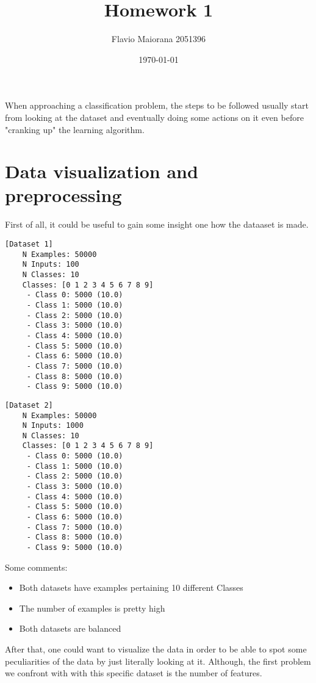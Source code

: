 \documentclass[12pt,a4paper,oneside]{article}
\title{Homework 1}	                                    %
\author{Flavio Maiorana 2051396}				                %
\date{\today}								    %
\begin{document}

\newpage

When approaching a classification problem, the steps to be followed
usually start from looking at the dataset and eventually doing some actions on
it even before "cranking up" the learning algorithm.

\section{Data visualization and preprocessing}

First of all, it could be useful to gain some insight one how the dataaset is
made.

\begin{verbatim}[Dataset 1]
    N Examples: 50000
    N Inputs: 100
    N Classes: 10
    Classes: [0 1 2 3 4 5 6 7 8 9]
     - Class 0: 5000 (10.0)
     - Class 1: 5000 (10.0)
     - Class 2: 5000 (10.0)
     - Class 3: 5000 (10.0)
     - Class 4: 5000 (10.0)
     - Class 5: 5000 (10.0)
     - Class 6: 5000 (10.0)
     - Class 7: 5000 (10.0)
     - Class 8: 5000 (10.0)
     - Class 9: 5000 (10.0)
\end{verbatim}

\begin{verbatim}[Dataset 2]
    N Examples: 50000
    N Inputs: 1000
    N Classes: 10
    Classes: [0 1 2 3 4 5 6 7 8 9]
     - Class 0: 5000 (10.0)
     - Class 1: 5000 (10.0)
     - Class 2: 5000 (10.0)
     - Class 3: 5000 (10.0)
     - Class 4: 5000 (10.0)
     - Class 5: 5000 (10.0)
     - Class 6: 5000 (10.0)
     - Class 7: 5000 (10.0)
     - Class 8: 5000 (10.0)
     - Class 9: 5000 (10.0)
\end{verbatim}

\newpage

Some comments:
\begin{itemize}
    \item Both datasets have examples pertaining 10 different Classes
    \item The number of examples is pretty high 
    \item Both datasets are balanced
\end{itemize}

After that, one could want to visualize the data in order to be able to spot
some peculiarities of the data by just literally looking at it. Although, the
first problem we confront with with this specific dataset is the number of
features.


% 

% 

% 



\nocite{*}  %
\end{document}
